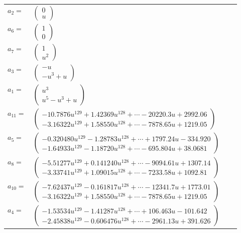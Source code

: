 \documentclass[1p]{elsarticle_modified}
\theoremstyle{definition}
\begin{document}
\begin{tabular}{m{7pt} m{180pt} m{7pt} m{180pt} }
\flushright $a_{2}=$&$\begin{pmatrix}0\\u\end{pmatrix}$ \\
\flushright $a_{6}=$&$\begin{pmatrix}1\\0\end{pmatrix}$ \\
\flushright $a_{7}=$&$\begin{pmatrix}1\\u^2\end{pmatrix}$ \\
\flushright $a_{3}=$&$\begin{pmatrix}- u\\- u^3+u\end{pmatrix}$ \\
\flushright $a_{1}=$&$\begin{pmatrix}u^3\\u^5- u^3+u\end{pmatrix}$ \\
\flushright $a_{11}=$&$\begin{pmatrix}-10.7876 u^{129}+1.42369 u^{128}+\cdots-20220.3 u+2992.06\\-3.16322 u^{129}+1.58550 u^{128}+\cdots-7878.65 u+1219.05\end{pmatrix}$ \\
\flushright $a_{5}=$&$\begin{pmatrix}-0.320480 u^{129}-1.28783 u^{128}+\cdots+1797.24 u-334.920\\-1.64933 u^{129}-1.18720 u^{128}+\cdots-695.804 u+38.0681\end{pmatrix}$ \\
\flushright $a_{8}=$&$\begin{pmatrix}-5.51277 u^{129}+0.141240 u^{128}+\cdots-9094.61 u+1307.14\\-3.33741 u^{129}+1.09015 u^{128}+\cdots-7233.58 u+1092.81\end{pmatrix}$ \\
\flushright $a_{10}=$&$\begin{pmatrix}-7.62437 u^{129}-0.161817 u^{128}+\cdots-12341.7 u+1773.01\\-3.16322 u^{129}+1.58550 u^{128}+\cdots-7878.65 u+1219.05\end{pmatrix}$ \\
\flushright $a_{4}=$&$\begin{pmatrix}-1.53534 u^{129}-1.41287 u^{128}+\cdots+106.463 u-101.642\\-2.45838 u^{129}-0.606476 u^{128}+\cdots-2961.13 u+391.626\end{pmatrix}$ \\

\end{tabular}
\end{document}

